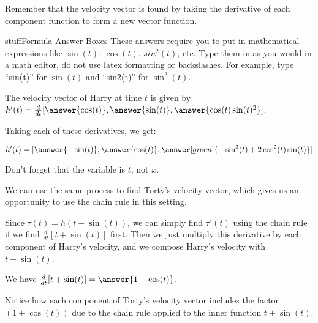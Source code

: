 \documentclass{ximera}
\begin{document}
\begin{problem}
    Remember that the velocity vector is found by taking the derivative of each component function to form a new vector function. 
    
    \begin{expandable}{stuff}{Formula Answer Boxes}
        These answers require you to put in mathematical expressions like $\sin(t)$, $\cos(t)$, $sin^2(t)$, etc. Type them in as you would in a math editor, do not use latex formatting or backslashes. For example, type ``sin(t)'' for $\sin(t)$ and ``sin\^2(t)'' for $\sin^2(t)$.
    \end{expandable}

    The velocity vector of Harry at time $t$ is given by $h'(t)=\frac{d}{dt}[ \answer{\cos(t)}, \answer{\sin(t)}, \answer{\cos(t) \sin(t)^2}]$.
    
    Taking each of these derivatives, we get:

    \[h'(t)=[ \answer{-\sin(t)}, \answer{\cos(t)}, \answer[given]{-\sin^3(t) + 2\cos^2(t) \sin(t)}]\]
    \begin{feedback}
        Don't forget that the variable is $t$, not $x$. 
    \end{feedback}
\end{problem}

We can use the same process to find Torty's velocity vector, which gives us an opportunity to use the chain rule in this setting.

\begin{problem}
    Since $\tau(t)=h(t+\sin(t))$, we can simply find $\tau'(t)$ using the chain rule if we find $\frac{d}{dt}[t+\sin(t)]$ first. Then we just multiply this derivative by each component of Harry's velocity, and we compose Harry's velocity with $t+\sin(t)$.

    We have $\frac{d}{dt}[t+\sin(t)]=\answer{1+\cos(t)}$.
    
    \begin{feedback}
        Notice how each component of Torty's velocity vector includes the factor $(1+\cos(t))$ due to the chain rule applied to the inner function $t+\sin(t)$.
    \end{feedback}

\end{problem}
\end{document}
